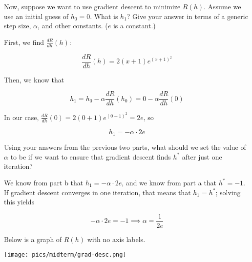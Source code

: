 \documentclass{article}
\begin{document}
\begin{probset}
\begin{prob}
\begin{subprobset}
\begin{subprob}[1.5 Points]
\begin{soln}
\end{soln}

\end{subprob}

\vspace{1in}

\begin{subprob}[4 Points]
Now, suppose we want to use gradient descent to minimize $R(h)$. Assume we use an initial guess of $h_0 = 0$. What is $h_1$? Give your answer in terms of a generic step size, $\alpha$, and other constants. ($e$ is a constant.)

\begin{soln}

First, we find $\frac{dR}{dh}(h)$:

$$\frac{dR}{dh}(h) = 2(x+1) e^{(x+1)^2}$$

Then, we know that

$$h_1 = h_0 - \alpha \frac{dR}{dh}(h_0) = 0 - \alpha \frac{dR}{dh}(0)$$

In our case, $\frac{dR}{dh}(0) = 2(0 + 1) e^{(0+1)^2} = 2e$, so

$$h_1 = -\alpha \cdot 2e$$

\end{soln}

\end{subprob}

\vspace{1.75in}

\begin{subprob}[1.5 Point]
Using your answers from the previous two parts, what should we set the value of $\alpha$ to be if we want to ensure that gradient descent finds $h^*$ after just one iteration?

\begin{soln}

We know from part b that $h_1 = -\alpha \cdot 2e$, and we know from part a that $h^* = -1$. If gradient descent converges in one iteration, that means that $h_1 = h^*$; solving this yields

$$-\alpha \cdot 2e = -1 \implies \alpha = \frac{1}{2e}$$

\end{soln}

\end{subprob}

\vspace{1.25in}

\begin{subprob}[1 Point]
Below is a graph of $R(h)$ with no axis labels.
\begin{center}
    \texttt{[image: pics/midterm/grad-desc.png]}
\end{center}


\end{subprob}
\end{subprobset}
\end{prob}
\end{probset}
\end{document}
